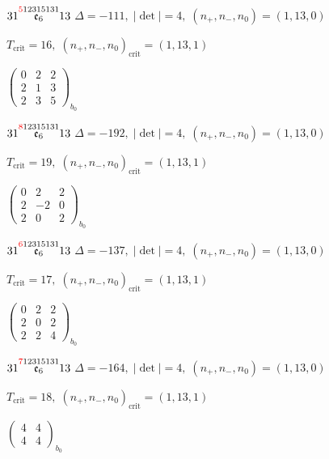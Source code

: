 \documentclass[10pt]{article}
\begin{document}
\smallskip

$31\overset{\textcolor{red}{5}12315131}{\mathfrak{e}_6}13$ \quad $\Delta=-111,\; |\det|=4,\; (n_+,n_-,n_0)=(1,13,0)$

\hspace{1em}$T_{\text{crit}}=16,\; (n_+,n_-,n_0)_{\text{crit}}=(1,13,1)$

\hspace{2em}$\left(\begin{smallmatrix}0 & 2 & 2 \\ 2 & 1 & 3 \\ 2 & 3 & 5\end{smallmatrix}\right)_{\!b_0}$

$31\overset{\textcolor{red}{8}12315131}{\mathfrak{e}_6}13$ \quad $\Delta=-192,\; |\det|=4,\; (n_+,n_-,n_0)=(1,13,0)$

\hspace{1em}$T_{\text{crit}}=19,\; (n_+,n_-,n_0)_{\text{crit}}=(1,13,1)$

\hspace{2em}$\left(\begin{smallmatrix}0 & 2 & 2 \\ 2 & -2 & 0 \\ 2 & 0 & 2\end{smallmatrix}\right)_{\!b_0}$

$31\overset{\textcolor{red}{6}12315131}{\mathfrak{e}_6}13$ \quad $\Delta=-137,\; |\det|=4,\; (n_+,n_-,n_0)=(1,13,0)$

\hspace{1em}$T_{\text{crit}}=17,\; (n_+,n_-,n_0)_{\text{crit}}=(1,13,1)$

\hspace{2em}$\left(\begin{smallmatrix}0 & 2 & 2 \\ 2 & 0 & 2 \\ 2 & 2 & 4\end{smallmatrix}\right)_{\!b_0}$

$31\overset{\textcolor{red}{7}12315131}{\mathfrak{e}_6}13$ \quad $\Delta=-164,\; |\det|=4,\; (n_+,n_-,n_0)=(1,13,0)$

\hspace{1em}$T_{\text{crit}}=18,\; (n_+,n_-,n_0)_{\text{crit}}=(1,13,1)$

\hspace{2em}$\left(\begin{smallmatrix}4 & 4 \\ 4 & 4\end{smallmatrix}\right)_{\!b_0}$
\end{document}
